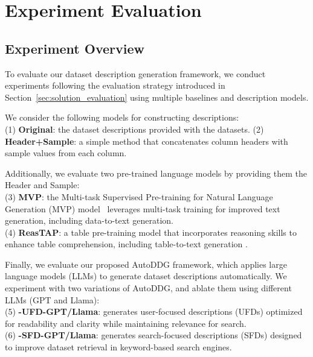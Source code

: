 \vspace{-.3cm}
\section{Experiment Evaluation}
\label{sec:experiment}

\subsection{Experiment Overview}
To evaluate our dataset description generation framework, we conduct experiments following the evaluation strategy introduced in Section~\ref{sec:solution_evaluation} using multiple baselines and description models.

% 
We consider the following models for constructing descriptions:\\
% 
(1) \textbf{Original}: the dataset descriptions provided with the datasets. %
% 
(2) \textbf{Header+Sample}: a simple method that concatenates column headers with sample values from each column.

\noindent Additionally, we evaluate two pre-trained language models by providing them the Header and Sample: \\
% 
(3) \textbf{MVP}: the Multi-task Supervised Pre-training for Natural Language Generation (MVP) model~\cite{tang2023mvp} leverages multi-task training for improved text generation, including data-to-text generation.\\
% 
(4) \textbf{ReasTAP}: a table pre-training model that incorporates reasoning skills to enhance table comprehension, including table-to-text generation \cite{zhao2022reastap}.

\noindent Finally, we evaluate our proposed AutoDDG framework, which applies large language models (LLMs) to generate dataset descriptions automatically. We experiment with two variations of AutoDDG, and ablate them using different LLMs (GPT and Llama):\\
% 
(5) \textbf{\SystemName-UFD-GPT/Llama}: generates user-focused descriptions (UFDs) optimized for readability and clarity while maintaining relevance for search.\\
% 
(6) \textbf{\SystemName-SFD-GPT/Llama}: generates search-focused descriptions (SFDs) designed to improve dataset retrieval in keyword-based search engines.

